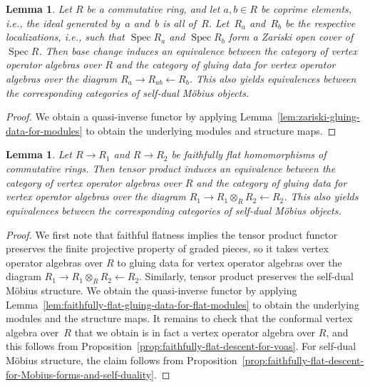 \documentclass[11pt]{article}
\DeclareMathOperator{\Spec}{Spec}
\newtheorem{lem}[thm]{Lemma}
\theoremstyle{definition}
\begin{document}
\begin{lem} \label{lem:zariski-gluing-for-voas}Let $R$ be a commutative ring, and let $a,b \in R$ be coprime elements, i.e., the ideal generated by~$a$ and~$b$ is all of~$R$. Let~$R_a$ and~$R_b$ be the respective localizations, i.e., such that $\Spec R_a$ and $\Spec R_b$ form a Zariski open cover of $\Spec R$. Then base change induces an equivalence between the category of vertex operator algebras over $R$ and the category of gluing data for vertex operator algebras over the diagram $R_a \to R_{ab} \leftarrow R_b$. This also yields equivalences between the corresponding categories of self-dual M\"obius objects.
\end{lem}
\begin{proof}We obtain a quasi-inverse functor by applying Lemma~\ref{lem:zariski-gluing-data-for-modules} to obtain the underlying modules and structure maps.
\end{proof}

\begin{lem} \label{lem:faithfully-flat-gluing-data-for-voas}Let $R \to R_1$ and $R \to R_2$ be faithfully flat homomorphisms of commutative rings. Then tensor product induces an equivalence between the category of vertex operator algebras over $R$ and the category of gluing data for vertex operator algebras over the diagram $R_1 \to R_1 \otimes_{R} R_2 \leftarrow R_2$. This also yields equivalences between the corresponding categories of self-dual M\"obius objects.
\end{lem}
\begin{proof}We first note that faithful flatness implies the tensor product functor preserves the finite projective property of graded pieces, so it takes vertex operator algebras over $R$ to gluing data for vertex operator algebras over the diagram $R_1 \to R_1 \otimes_{R} R_2 \leftarrow R_2$. Similarly, tensor pro\-duct preserves the self-dual M\"obius structure. We obtain the quasi-inverse functor by applying Lemma~\ref{lem:faithfully-flat-gluing-data-for-flat-modules} to obtain the underlying modules and the structure maps. It remains to check that the conformal vertex algebra over~$R$ that we obtain is in fact a vertex operator algebra over $R$, and this follows from Proposition~\ref{prop:faithfully-flat-descent-for-voas}. For self-dual M\"obius structure, the claim follows from Proposition~\ref{prop:faithfully-flat-descent-for-Mobius-forms-and-self-duality}.
\end{proof}
\end{document}
